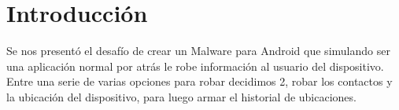 \section{Introducción}

Se nos presentó el desafío de crear un Malware para Android que simulando ser una aplicación normal por atrás le robe información al usuario del dispositivo. Entre una serie de varias opciones para robar decidimos 2, robar los contactos y la ubicación del dispositivo, para luego armar el historial de ubicaciones.
